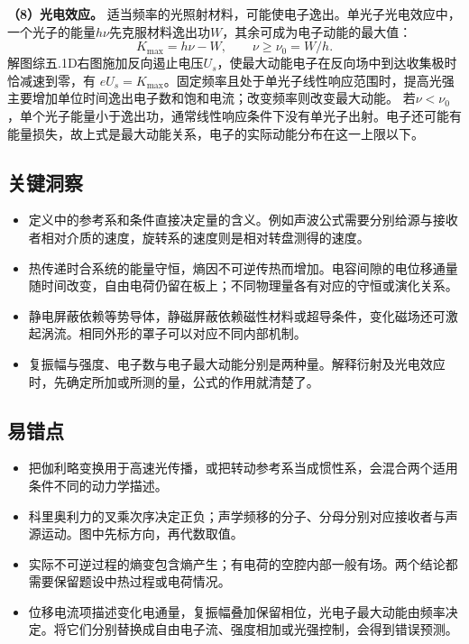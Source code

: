 \documentclass[UTF8,fontset=fandol,a4paper,11pt]{ctexart}
\begin{document}
\textbf{（8）光电效应。}
适当频率的光照射材料，可能使电子逸出。单光子光电效应中，一个光子的能量$h\nu$先克服材料逸出功$W$，其余可成为电子动能的最大值：
\[
\boxed{K_{\max}=h\nu-W},\qquad
\nu\ge\nu_0=W/h.
\]
解图综五.1D右图施加反向遏止电压$U_s$，使最大动能电子在反向场中到达收集极时恰减速到零，有
$eU_s=K_{\max}$。固定频率且处于单光子线性响应范围时，提高光强主要增加单位时间逸出电子数和饱和电流；改变频率则改变最大动能。
若$\nu<\nu_0$，单个光子能量小于逸出功，通常线性响应条件下没有单光子出射。电子还可能有能量损失，故上式是最大动能关系，电子的实际动能分布在这一上限以下。




\subsection*{关键洞察}

\begin{itemize}
\item 定义中的参考系和条件直接决定量的含义。例如声波公式需要分别给源与接收者相对介质的速度，旋转系的速度则是相对转盘测得的速度。
\item 热传递时合系统的能量守恒，熵因不可逆传热而增加。电容间隙的电位移通量随时间改变，自由电荷仍留在板上；不同物理量各有对应的守恒或演化关系。
\item 静电屏蔽依赖等势导体，静磁屏蔽依赖磁性材料或超导条件，变化磁场还可激起涡流。相同外形的罩子可以对应不同内部机制。
\item 复振幅与强度、电子数与电子最大动能分别是两种量。解释衍射及光电效应时，先确定所加或所测的量，公式的作用就清楚了。
\end{itemize}



\subsection*{易错点}

\begin{itemize}
\item 把伽利略变换用于高速光传播，或把转动参考系当成惯性系，会混合两个适用条件不同的动力学描述。
\item 科里奥利力的叉乘次序决定正负；声学频移的分子、分母分别对应接收者与声源运动。图中先标方向，再代数取值。
\item 实际不可逆过程的熵变包含熵产生；有电荷的空腔内部一般有场。两个结论都需要保留题设中热过程或电荷情况。
\item 位移电流项描述变化电通量，复振幅叠加保留相位，光电子最大动能由频率决定。将它们分别替换成自由电子流、强度相加或光强控制，会得到错误预测。
\end{itemize}
\end{document}
